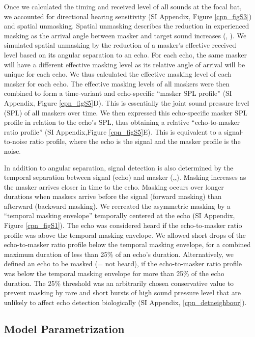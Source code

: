 \documentclass[
]{book}
\begin{document}
Once we calculated the timing and received level of all sounds at the focal bat, we accounted for directional hearing sensitivity (SI Appendix, Figure \ref{cpn_figS3}) and spatial unmasking. Spatial unmasking describes the reduction in experienced masking as the arrival angle between masker and target sound increases (\citet{ebata2003a}, \citet{suemer2009a}). We simulated spatial unmasking by the reduction of a masker's effective received level based on its angular separation to an echo. For each echo, the same masker will have a different effective masking level as its relative angle of arrival will be unique for each echo. We thus calculated the effective masking level of each masker for each echo. The effective masking levels of all maskers were then combined to form a time-variant and echo-specific ``masker SPL profile'' (SI Appendix, Figure \ref{cpn_figS5}D). This is essentially the joint sound pressure level (SPL) of all maskers over time. We then expressed this echo-specific masker SPL profile in relation to the echo's SPL, thus obtaining a relative ``echo-to-masker ratio profile'' (SI Appendix,Figure \ref{cpn_figS5}E). This is equivalent to a signal-to-noise ratio profile, where the echo is the signal and the masker profile is the noise.

In addition to angular separation, signal detection is also determined by the temporal separation between signal (echo) and masker (\citet{m1989a},\citet{yost2007a},\citet{siewert2004a}). Masking increases as the masker arrives closer in time to the echo. Masking occurs over longer durations when maskers arrive before the signal (forward masking) than afterward (backward masking). We recreated the asymmetric masking by a ``temporal masking envelope'' temporally centered at the echo (SI Appendix, Figure \ref{cpn_figS1}). The echo was considered heard if the echo-to-masker ratio profile was above the temporal masking envelope. We allowed short drops of the echo-to-masker ratio profile below the temporal masking envelope, for a combined maximum duration of less than 25\% of an echo's duration. Alternatively, we defined an echo to be masked (= not heard), if the echo-to-masker ratio profile was below the temporal masking envelope for more than 25\% of the echo duration. The 25\% threshold was an arbitrarily chosen conservative value to prevent masking by rare and short bursts of high sound pressure level that are unlikely to affect echo detection biologically (SI Appendix, \ref{cpn_detneighbour}).

\hypertarget{model-parametrization}{%
\subsection{Model Parametrization}\label{model-parametrization}}
\end{document}
